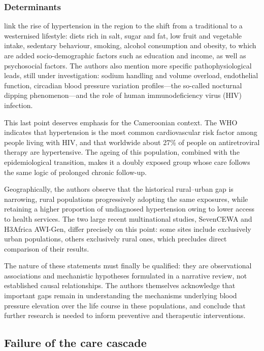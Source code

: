 \documentclass[12pt,a4paper,oneside]{report}
\begin{document}
\subsubsection{Determinants}

\textcite{gafane2025} link the rise of hypertension in the region to the shift from a traditional to a westernised lifestyle: diets rich in salt, sugar and fat, low fruit and vegetable intake, sedentary behaviour, smoking, alcohol consumption and obesity, to which are added socio-demographic factors such as education and income, as well as psychosocial factors. The authors also mention more specific pathophysiological leads, still under investigation: sodium handling and volume overload, endothelial function, circadian blood pressure variation profiles---the so-called nocturnal dipping phenomenon---and the role of human immunodeficiency virus (HIV) infection.

This last point deserves emphasis for the Cameroonian context. The WHO \parencite{who2023hypertension} indicates that hypertension is the most common cardiovascular risk factor among people living with HIV, and that worldwide about 27\% of people on antiretroviral therapy are hypertensive. The ageing of this population, combined with the epidemiological transition, makes it a doubly exposed group whose care follows the same logic of prolonged chronic follow-up.

Geographically, the authors observe that the historical rural--urban gap is narrowing, rural populations progressively adopting the same exposures, while retaining a higher proportion of undiagnosed hypertension owing to lower access to health services. The two large recent multinational studies, SevenCEWA and H3Africa AWI-Gen, differ precisely on this point: some sites include exclusively urban populations, others exclusively rural ones, which precludes direct comparison of their results.

The nature of these statements must finally be qualified: they are observational associations and mechanistic hypotheses formulated in a narrative review, not established causal relationships. The authors themselves acknowledge that important gaps remain in understanding the mechanisms underlying blood pressure elevation over the life course in these populations, and conclude that further research is needed to inform preventive and therapeutic interventions.

\subsection{Failure of the care cascade}\label{sec:cascade}
\end{document}
